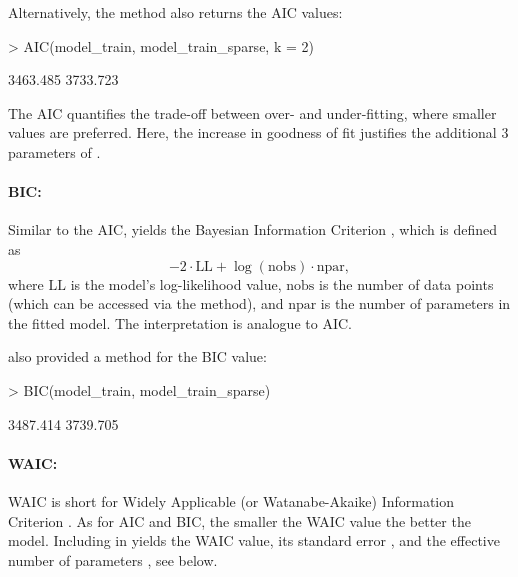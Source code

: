 \documentclass[article]{jss}
\newcommand{\fct}[1]{\code{#1()}}
\begin{document}
Alternatively, the \fct{AIC} method also returns the AIC values:

\begin{Schunk}
\begin{Sinput}
> AIC(model_train, model_train_sparse, k = 2)
\end{Sinput}
\begin{Soutput}
[1] 3463.485 3733.723
\end{Soutput}
\end{Schunk}

The AIC quantifies the trade-off between over- and under-fitting, where smaller values are preferred. Here, the increase in goodness of fit justifies the additional 3 parameters of .

\paragraph{BIC:}

Similar to the AIC,  yields the Bayesian Information Criterion \citep{Schwarz:1978}, which is defined as $$-2 \cdot \text{LL} + \log{(\text{nobs})} \cdot \text{npar},$$
where $\text{LL}$ is the model's log-likelihood value, $\text{nobs}$ is the number of data points (which can be accessed via the \fct{nobs} method), and $\text{npar}$ is the number of parameters in the fitted model. The interpretation is analogue to AIC.

 also provided a method for the BIC value:

\begin{Schunk}
\begin{Sinput}
> BIC(model_train, model_train_sparse)
\end{Sinput}
\begin{Soutput}
[1] 3487.414 3739.705
\end{Soutput}
\end{Schunk}

\paragraph{WAIC:}

WAIC is short for Widely Applicable (or Watanabe-Akaike) Information Criterion \citep{Watanabe:2010}. As for AIC and BIC, the smaller the WAIC value the better the model. Including  in  yields the WAIC value, its standard error , and the effective number of parameters , see below.
\end{document}
